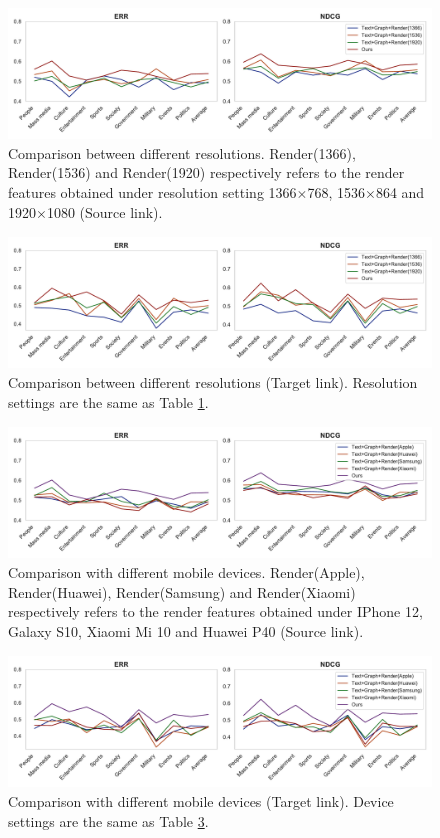 \begin{figure}[t]
\centering
\includegraphics[width=1\textwidth,height=3.5cm]{exp_tab3_src}
\caption{Comparison between different resolutions. Render(1366), Render(1536) and Render(1920) respectively refers to the render features obtained under resolution setting 1366$\times$768, 1536$\times$864 and 1920$\times$1080 (Source link).}
\label{table_cmp5}
\end{figure}

\begin{figure}[t]
\centering
\includegraphics[width=1\textwidth,height=3.5cm]{exp_tab3_tgt}
\caption{Comparison between different resolutions (Target link). Resolution settings are the same as Table \ref{table_cmp5}.}
\label{table_cmp6}
\end{figure}

\begin{figure}[t]
\centering
\includegraphics[width=1\textwidth,height=3.5cm]{exp_tab4_src}
\caption{Comparison with different mobile devices. Render(Apple), Render(Huawei), Render(Samsung) and Render(Xiaomi) respectively refers to the render features obtained under IPhone 12, Galaxy S10, Xiaomi Mi 10 and Huawei P40 (Source link).}
\label{table_cmp7}
\end{figure}

\begin{figure}[t]
\centering
\includegraphics[width=1\textwidth,height=3.5cm]{exp_tab4_tgt}
\caption{Comparison with different mobile devices (Target link). Device settings are the same as Table \ref{table_cmp7}.}
\label{table_cmp8}
\end{figure}

